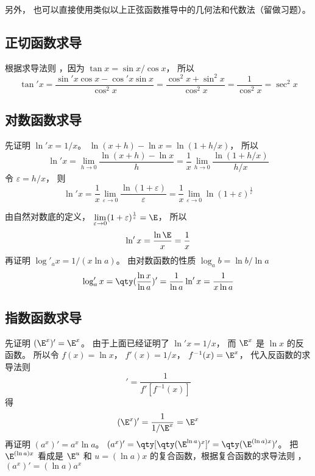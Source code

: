 另外， 也可以直接使用类似以上正弦函数推导中的几何法和代数法（留做习题）。

\subsection{正切函数求导}
根据求导法则%
，因为 $\tan x = \sin x/\cos x$， 所以
\begin{equation}
\tan' x = \frac{\sin' x \cos x - \cos' x\sin x}{\cos^2 x} = \frac{\cos^2x + \sin^2 x}{\cos^2 x} = \frac{1}{\cos ^2 x} = \sec ^2 x
\end{equation}

\subsection{对数函数求导}
先证明 $\ln' x = {1}/{x}$。  $\ln(x + h) - \ln x = \ln(1 + h/x)$， 所以
 \begin{equation}
\ln 'x = \lim_{h \to 0} \frac{\ln(x + h) - \ln x}{h} = \frac{1}{x} \lim_{h \to 0} \frac{\ln(1 + h/x)}{h/x}
\end{equation}
令 $\varepsilon  = h/x$， 则
\begin{equation}
\ln' x = \frac{1}{x} \lim_{\varepsilon  \to 0} \frac{\ln(1 + \varepsilon)}{\varepsilon } = \frac{1}{x} \lim_{\varepsilon  \to 0} \ln(1 + \varepsilon)^{\frac{1}{\varepsilon }} 
\end{equation}
 
由自然对数底的定义， $\lim\limits_{\varepsilon  \to 0} (1 + \varepsilon)^{\frac{1}{\varepsilon }} = \E$， 所以
 \begin{equation}
\ln 'x = \frac{\ln \E}{x} = \frac{1}{x}
\end{equation}
再证明 $\log'_a x = {1}/(x\ln a)$。 
由对数函数的性质 $\log_a b = \ln b/\ln a$
\begin{equation}
\log'_a x = \qty(\frac{\ln x}{\ln a})' = \frac{1}{\ln a}\ln' x = \frac{1}{x\ln a}
\end{equation}

\subsection{指数函数求导}
先证明 $(\E^x)' = \E^x$。 
由于上面已经证明了 $ \ln'x = 1/x$， 而 $\E^x$ 是 $\ln x$ 的反函数。 所以令 $f(x) = \ln x$， $f'(x) = 1/x$，  $f^{ - 1} (x) = \E^x$， 代入反函数的求导法则%
\begin{equation}
[f^{-1} (x)]' = \frac{1}{f'[f^{ - 1}(x)]}
\end{equation} 
得
\begin{equation}
(\E^x)' = \frac{1}{1/\E^x} = \E^x
\end{equation}
再证明 $(a^x)' = a^x \ln a$。  $(a^x)' = \qty[ \qty( \E^{\ln a} )^x ]' = \qty( \E^{(\ln a) x} )'$。 把 $\E^{(\ln a) x}$ 看成是 $\E^u$ 和 $u = (\ln a) x$ 的复合函数，根据复合函数的求导法则 ，$(a^x)' = (\ln a) a^x$ 

